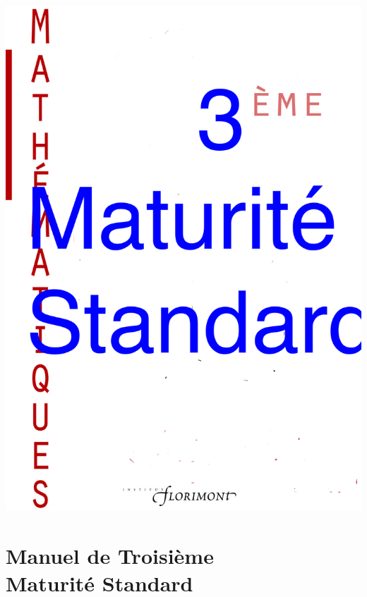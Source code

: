 \documentclass[TS]{sesamanuel}
\begin{document}
\pagestyle{empty}

\includegraphics[width=.92\textwidth]{couverture}

\newpage \pagestyle{empty}
\addto\captionsfrench{\renewcommand{\contentsname}{Sommaire}}




\themaM %
\chapter{Manuel de Troisième\\Maturité Standard}

\vfill
\end{document}
